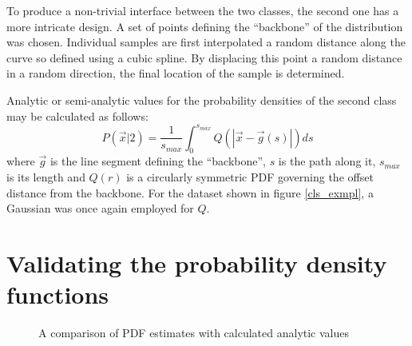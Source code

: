 To produce a non-trivial interface between the two classes, 
the second one has a more intricate design.
A set of points defining the ``backbone'' of the distribution was chosen.
Individual samples are first interpolated a random distance along 
the curve so defined using a cubic spline. \cite{nr_inc2} \cite{gsl_ref}
By displacing this point a random distance in a random direction, 
the final location of the sample is determined.

Analytic or semi-analytic values for the probability densities of
the second class may be calculated as follows:
\begin{equation}
P(\vec x | 2) = \frac{1}{s_{max}}\int_0^{s_{max}} Q(|\vec x - \vec g(s)|) ds
\label{pdf_sc2}
\end{equation}
where $\vec g$ is the line segment
defining the ``backbone'', $s$ is the path along it, $s_{max}$ is its
length and $Q(r)$ is a circularly symmetric
PDF governing the offset distance from the backbone.
For the dataset shown in figure \ref{cls_exmpl}, a Gaussian was once 
again employed for $Q$.

\section{Validating the probability density functions}

\begin{figure}
  \label{pdf1_agf}
  \caption{A comparison of PDF estimates with calculated analytic values}
\end{figure}

